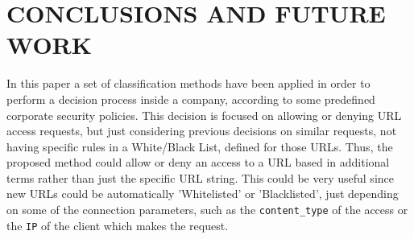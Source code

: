 \documentclass{llncs}
\begin{document}
% 

% 
% 
% 
% 


%
\section{\uppercase{Conclusions and Future Work}}
\label{sec:conclusions}

\noindent In this paper a set of classification methods have been applied
in order to perform a decision process inside a company, according to
some predefined corporate security policies. 
This decision is focused on allowing or denying URL access requests, but just considering previous decisions on similar requests, not having specific rules in a White/Black List, defined for those URLs. Thus, the proposed method could allow or deny an access to a URL based in additional terms rather than just the specific URL string. This could be very useful since new URLs could be automatically 'Whitelisted' or 'Blacklisted', just depending on some of the connection parameters, such as the \texttt{content\_type} of the access or the \texttt{IP} of the client which makes the request.
\end{document}

